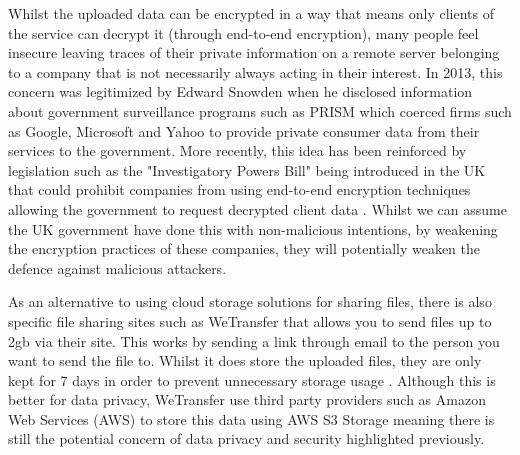 \documentclass[]{report}
\begin{document}
		 	Whilst the uploaded data can be encrypted in a way that means only clients of the service can decrypt it (through end-to-end encryption), many people feel insecure leaving traces of their private information on a remote server belonging to a company that is not necessarily always acting in their interest. In 2013, this concern was legitimized by Edward Snowden when he disclosed information about government surveillance programs such as PRISM which coerced firms such as Google, Microsoft and Yahoo to provide private consumer data from their services to the government.\cite{PRISM}  More recently, this idea has been reinforced by legislation such as the "Investigatory Powers Bill" being introduced in the UK that could prohibit companies from using end-to-end encryption techniques allowing the government to request decrypted client data \cite{IPB Encryption}. Whilst we can assume the UK government have done this with non-malicious intentions, by weakening the encryption practices of these companies, they will potentially weaken the defence against malicious attackers.
			
			As an alternative to using cloud storage solutions for sharing files, there is also specific file sharing sites such as WeTransfer that allows you to send files up to 2gb via their site. This works by sending a link through email to the person you want to send the file to. Whilst it does store the uploaded files, they are only kept for 7 days in order to prevent unnecessary storage usage \cite{WeTransfer Storage Time}. Although this is better for data privacy, WeTransfer use third party providers such as Amazon Web Services (AWS) to store this data using AWS S3 Storage \cite{WeTransfer AWS Case Study} meaning there is still the potential concern of data privacy and security highlighted previously.
			
\end{document}
